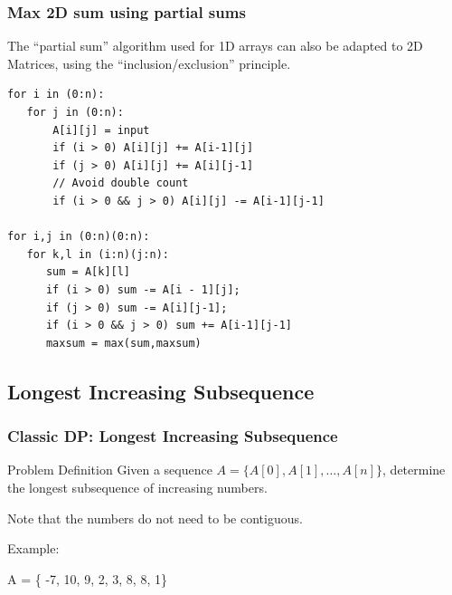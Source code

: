 \documentclass{beamer}
\begin{document}
\begin{frame}[fragile]
  \frametitle{Max 2D sum using partial sums}
  \begin{block}{}
    The ``partial sum'' algorithm used for 1D arrays can also be
    adapted to 2D Matrices, using the ``inclusion/exclusion''
    principle.
  \end{block}

\begin{block}{}
{\smaller
\begin{verbatim}
for i in (0:n):
   for j in (0:n):
       A[i][j] = input
       if (i > 0) A[i][j] += A[i-1][j]
       if (j > 0) A[i][j] += A[i][j-1]
       // Avoid double count
       if (i > 0 && j > 0) A[i][j] -= A[i-1][j-1]  

for i,j in (0:n)(0:n):
   for k,l in (i:n)(j:n):
      sum = A[k][l]
      if (i > 0) sum -= A[i - 1][j];
      if (j > 0) sum -= A[i][j-1];
      if (i > 0 && j > 0) sum += A[i-1][j-1]
      maxsum = max(sum,maxsum)   
\end{verbatim}
}
\end{block}

\end{frame}

\subsection{Longest Increasing Subsequence}

\begin{frame}
  \frametitle{Classic DP: Longest Increasing Subsequence}
  \begin{block}{Problem Definition}
    Given a sequence $A = \{A[0],A[1],\ldots,A[n]\}$, determine the 
    longest subsequence of increasing numbers.

    \smallskip

    Note that the numbers do not need to be contiguous.
  \end{block}

  Example:

  \bigskip

  A = \{ \alert{-7}, 10, 9, \alert{2}, \alert{3}, \alert{8}, 8, 1\}
\end{frame}
\end{document}
